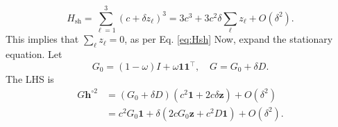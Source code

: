 \documentclass[11pt, reqno]{amsart}
\theoremstyle{notestyle}
\theoremstyle{defstyle}
\begin{document}
\begin{equation}
    H_{\text{sh}} = \sum_{\ell=1}^3 (c + \delta z_\ell)^3 = 3c^3 + 3c^2 \delta\sum_\ell z_\ell + O(\delta^2).
\end{equation}
This implies that $\sum_\ell z_\ell = 0$, as per Eq.  \eqref{eq:Hsh}
Now, expand the stationary equation. Let
\begin{equation}
    G_0 = (1 - \omega)I + \omega \bm1 \bm1^\top,\quad G = G_0 + \delta D.
\end{equation}
The LHS is
\begin{align}
    G\mathbf h^{\circ 2} &= (G_0 + \delta D)(c^2 \bm1 + 2c\delta \mathbf z) + O(\delta^2) \\
    & = c^2 G_0 \bm 1 + \delta(2cG_0 \mathbf z + c^2 D\bm 1) + O(\delta^2).
\end{align}
\end{document}
